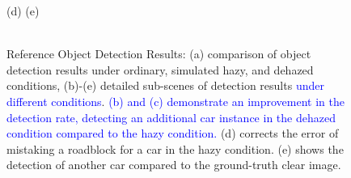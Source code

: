 \documentclass[lettersize,journal]{IEEEtran}
\begin{document}
\begin{figure}[pht]
    (d) \qquad\qquad\qquad\qquad\qquad\qquad\qquad\qquad\qquad\qquad\qquad\qquad\quad (e) \\

    \quad \\
    
    \caption{Reference Object Detection Results: (a) comparison of object detection results under ordinary, simulated hazy, and dehazed conditions, (b)-(e) detailed sub-scenes of detection results \textcolor{blue}{under different conditions}. \textcolor{blue}{(b) and (c) demonstrate an improvement in the detection rate, detecting an additional car instance in the dehazed condition compared to the hazy condition.} (d) corrects the error of mistaking a roadblock for a car in the hazy condition. (e) shows the detection of another car compared to the ground-truth clear image.}
    
    \label{object_detection}
    
\end{figure}
\end{document}
